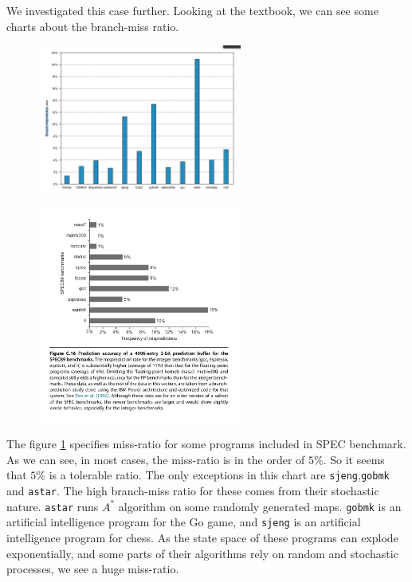 \documentclass[12pt]{article}
\begin{document}
\begin{itemize}
We investigated this case further. Looking at the textbook, we can see some charts about the branch-miss ratio.

\begin{figure}[H]
	\centering
	\includegraphics[width=0.6\textwidth]{./images/branchmiss1.jpg}
	\caption{}	
	\label{fig:branch1}
\end{figure}

\begin{figure}[H]
	\centering
	\includegraphics[width=0.6\textwidth]{./images/branchmiss2.jpg}
	\caption{}	
	\label{fig:branch2}
\end{figure}

The figure \ref{fig:branch1} specifies miss-ratio for some programs included in SPEC benchmark. As we can see, in most cases, the miss-ratio is in the order of $5\%$. So it seems that $5\%$ is a tolerable ratio. The only exceptions in this chart are \Verb+sjeng+,\Verb+gobmk+ and \Verb+astar+. The high branch-miss ratio for these comes from their stochastic nature. \Verb+astar+ runs $A^*$ algorithm on some randomly generated maps. \Verb+gobmk+ is an artificial intelligence program for the Go game, and \Verb+sjeng+ is an artificial intelligence program for chess. As the state space of these programs can explode exponentially, and some parts of their algorithms rely on random and stochastic processes, we see a huge miss-ratio.


\end{itemize}
\end{document}
